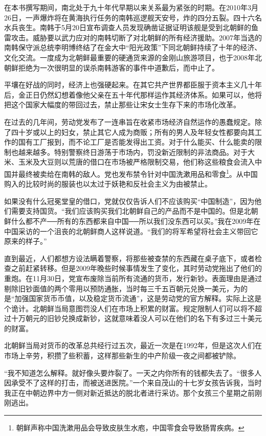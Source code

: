在本书撰写期间，南北处于九十年代早期以来关系最为紧张的时期。在2010年3月26日，一声爆炸将在黄海执行任务的南韩巡逻舰天安号，炸的四分五裂。四十六名水兵丧生。南韩于5月20日宣布调查人员发现确凿证据证明该舰是受到北朝鲜的鱼雷攻击。威胁要以武力应对的南韩切断了对北朝鲜的所有经济援助。2007年当选的南韩保守派总统李明博终结了在金大中“阳光政策”下同北朝鲜持续了十年的经济、文化交流。一度成为北朝鲜最重要的硬通货来源的金刚山旅游项目，也于2008年北朝鲜拒绝为一次很明显的误杀南韩游客的事件中道歉后，而中止了。

平壤在好战的同时，经济上也强硬起来。在其它共产世界都臣服于资本主义几十年后，金正日仍然幻想着像他父亲在五十年代那样运作其经济体系。如果可以，他将把这个国家大幅度的带回过去，禁止那些让宋女士生存下来的市场化改革。

在过去的几年间，劳动党发布了一连串旨在收紧市场经济自然运作的愚蠢规定。除了四十岁或以上的妇女，禁止其它人成为商贩；所有的男人及年轻女性都要向其工作的国有工厂报到，而不论工厂是否能发得出工资。对于什么能买、什么能卖的限制也越来越多。特别警察终日游荡于市场内，罚没新近限制的非法商品。对于大米、玉米及大豆则以荒唐的借口在市场被严格限制交易，他们称这些粮食会流入中国并最终被卖给在南韩的敌人。党也发布禁令针对中国洗漱用品和零食\footnote{朝鲜声称中国洗漱用品会导致皮肤生水庖，中国零食会导致肠胃疾病。}。从中国购入的比较时尚的服装也以太过于妖艳和反社会主义为由被禁止。

如果没有什么冠冕堂皇的借口，党就仅仅告诉人们不应该购买“中国制造”，因为他们需要支持国货。“我们应该购买我们北朝鲜自己的产品而不是中国的。但是北朝鲜什么都不产──所有的东西都来自中国──所以我们没东西可以买。”我在2009年在中国采访的一个沮丧的北朝鲜商人这样说道。“我们的将军希望将社会主义带回它原来的样子。”

直到最近，人们都想方设法瞒着警察，将那些被查禁的东西藏在桌子底下，或者检查之前赶紧转移。但是2009年晚些时候事情发生了变化，其时劳动党拖出了他们的重炮。在11月30日，党宣布废除当前所有流通的货币，发行新钞。表面理由是通过剔除旧钞面值的两个零用以预防通胀，当时每三千五百朝元兑换一美元，为的是“加强国家货币币值，以及稳定货币流通”，这是劳动党的官方解释。实际上这是个诡计。北朝鲜当局意图罚没人们在市场上积累的财富。规定限制人们可以将不超过十万朝元的旧钞兑换成新钞，这就意味着没人可以在他们的名下有多过三十美元的财富。

北朝鲜当局对货币的改革总共经行过五次，最近一次是在1992年，但是这次人们在市场上辛劳，积攒了些积蓄，这样那些新生的中产阶级一夜之间都被铲除。

“我不知道怎么解释。就好像头要炸裂了。一天之内你所有的钱都失去了。“很多人因承受不了这样的打击，而被送进医院。”一个来自茂山的十七岁女孩告诉我，当时我正在中朝边界中方一侧对新近抵达的脱北者进行采访。那个女孩三个星期之前刚刚逃出。

